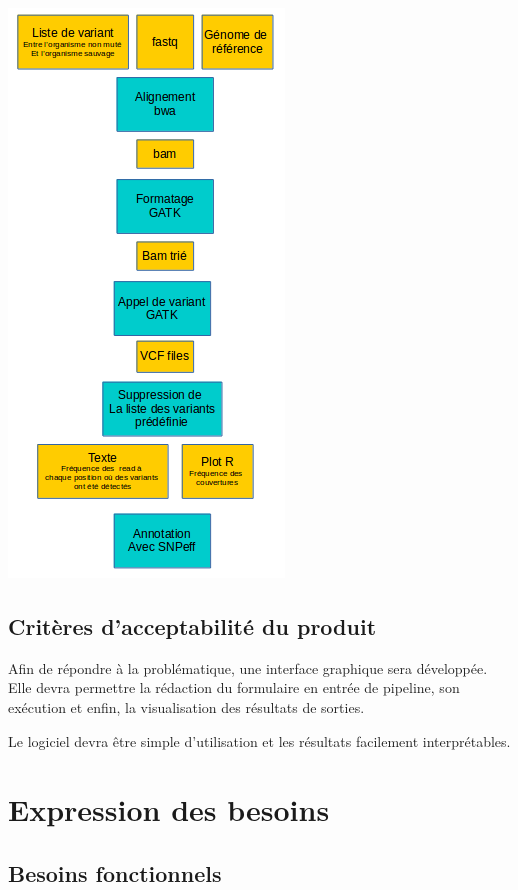 \documentclass[12pt]{article}
\begin{document}
\begin{center} \includegraphics[scale=0.8]{schemaPipeline.png} \end{center}

\subsection{Critères d'acceptabilité du produit}

Afin de répondre à la problématique, une interface graphique sera développée. Elle devra permettre la rédaction du formulaire en entrée de pipeline, son exécution et enfin, la visualisation des résultats de sorties.

Le logiciel devra être simple d'utilisation et les résultats facilement interprétables.

\section{Expression des besoins}
\subsection{Besoins fonctionnels}
\end{document}
